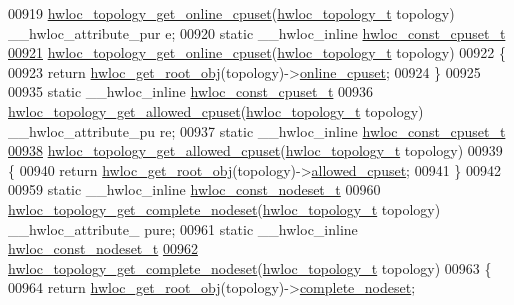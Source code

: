 \begin{DoxyCode}
00919 \hyperlink{a00060_gafeb07985e2cc66aee1da447aff0bcab8}{hwloc_topology_get_online_cpuset}(\hyperlink{a00039_ga9d1e76ee15a7dee158b786c30b6a6e38}{hwloc_topology_t} topology) \_\_hwloc\_attribute\_pur
      e;
00920 \textcolor{keyword}{static} \_\_hwloc\_inline \hyperlink{a00040_ga1f784433e9b606261f62d1134f6a3b25}{hwloc_const_cpuset_t}
\hypertarget{a00031_source_l00921}{}\hyperlink{a00060_gafeb07985e2cc66aee1da447aff0bcab8}{00921} \hyperlink{a00060_gafeb07985e2cc66aee1da447aff0bcab8}{hwloc_topology_get_online_cpuset}(\hyperlink{a00039_ga9d1e76ee15a7dee158b786c30b6a6e38}{hwloc_topology_t} topology)
00922 \{
00923   \textcolor{keywordflow}{return} \hyperlink{a00053_gadbf58f6e187efbdb3cd9a8e30311b7d7}{hwloc_get_root_obj}(topology)->\hyperlink{a00016_a8842d56c2975380f327ea401c5f53564}{online_cpuset};
00924 \}
00925 
00935 \textcolor{keyword}{static} \_\_hwloc\_inline \hyperlink{a00040_ga1f784433e9b606261f62d1134f6a3b25}{hwloc_const_cpuset_t}
00936 \hyperlink{a00060_ga08e3b14e1fe7642b383633d34c1f3c4a}{hwloc_topology_get_allowed_cpuset}(\hyperlink{a00039_ga9d1e76ee15a7dee158b786c30b6a6e38}{hwloc_topology_t} topology) \_\_hwloc\_attribute\_pu
      re;
00937 \textcolor{keyword}{static} \_\_hwloc\_inline \hyperlink{a00040_ga1f784433e9b606261f62d1134f6a3b25}{hwloc_const_cpuset_t}
\hypertarget{a00031_source_l00938}{}\hyperlink{a00060_ga08e3b14e1fe7642b383633d34c1f3c4a}{00938} \hyperlink{a00060_ga08e3b14e1fe7642b383633d34c1f3c4a}{hwloc_topology_get_allowed_cpuset}(\hyperlink{a00039_ga9d1e76ee15a7dee158b786c30b6a6e38}{hwloc_topology_t} topology)
00939 \{
00940   \textcolor{keywordflow}{return} \hyperlink{a00053_gadbf58f6e187efbdb3cd9a8e30311b7d7}{hwloc_get_root_obj}(topology)->\hyperlink{a00016_afa3c59a6dd3da8ffa48710780a1bfb34}{allowed_cpuset};
00941 \}
00942 
00959 \textcolor{keyword}{static} \_\_hwloc\_inline \hyperlink{a00040_ga2f5276235841ad66a79bedad16a5a10c}{hwloc_const_nodeset_t}
00960 \hyperlink{a00061_gaddb7a1f3d71510bb011189e0b8edf29f}{hwloc_topology_get_complete_nodeset}(\hyperlink{a00039_ga9d1e76ee15a7dee158b786c30b6a6e38}{hwloc_topology_t} topology) \_\_hwloc\_attribute\_
      pure;
00961 \textcolor{keyword}{static} \_\_hwloc\_inline \hyperlink{a00040_ga2f5276235841ad66a79bedad16a5a10c}{hwloc_const_nodeset_t}
\hypertarget{a00031_source_l00962}{}\hyperlink{a00061_gaddb7a1f3d71510bb011189e0b8edf29f}{00962} \hyperlink{a00061_gaddb7a1f3d71510bb011189e0b8edf29f}{hwloc_topology_get_complete_nodeset}(\hyperlink{a00039_ga9d1e76ee15a7dee158b786c30b6a6e38}{hwloc_topology_t} topology)
00963 \{
00964   \textcolor{keywordflow}{return} \hyperlink{a00053_gadbf58f6e187efbdb3cd9a8e30311b7d7}{hwloc_get_root_obj}(topology)->\hyperlink{a00016_ac38c4012127525ef74c5615c526f4c2e}{complete_nodeset};

\end{DoxyCode}
